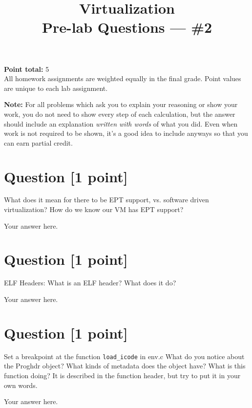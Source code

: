 \documentclass[11pt]{article}
\providecommand{\due}{}
\begin{document}
\title{Virtualization\\Pre-lab Questions --- \#2}
\date{\due}

\maketitle

\noindent \textbf{Point total:} 5
\\ All homework assignments are weighted equally in the final grade. Point values are unique to each lab assignment.

\textbf{Note:} For all problems which ask you to explain your reasoning or show your work, you do not need to show every step of each calculation, but the answer should include an explanation \emph{written with words} of what you did.  Even when work is not required to be shown, it’s a good idea to include anyways so that you can earn partial credit.

\section{Question [1 point]}

What does it mean for there to be EPT support, vs. software driven virtualization? How do we know our VM has EPT support?

\begin{solution}
Your answer here.
\end{solution}


\section{Question [1 point]}

ELF Headers:
What is an ELF header? What does it do?

\begin{solution}
Your answer here.
\end{solution}


\section{Question [1 point]}

Set a breakpoint at the function \texttt{load\_icode\(\)} in env.c What do you notice about the Proghdr object? What kinds of metadata does the object have? What is this function doing? It is described in the function header, but try to put it in your own words.

\begin{solution}
Your answer here.
\end{solution}
\end{document}
